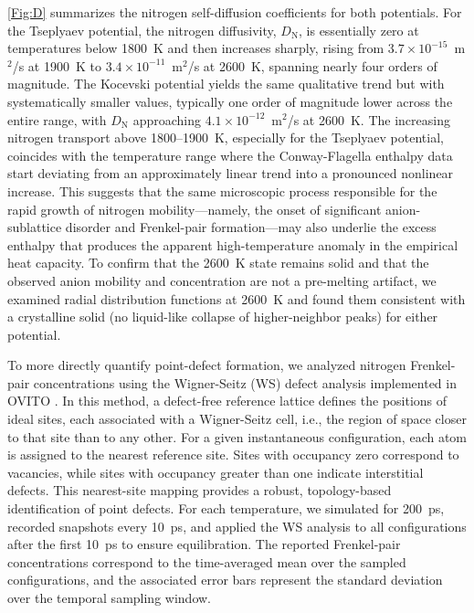 \documentclass[preprint,12pt,sort&compress]{elsarticle}
\newcommand{\?}{\stackrel{?}{=}}
\begin{document}
\cref{Fig:D} summarizes the nitrogen self-diffusion coefficients for both potentials. For the Tseplyaev potential, the nitrogen diffusivity, $D_\text{N}$, is essentially zero at temperatures below 1800~K and then increases sharply, rising from $3.7\times10^{-15}$~m$^{2}$/s at 1900~K to $3.4\times10^{-11}$~m$^{2}$/s at 2600~K, spanning nearly four orders of magnitude. The Kocevski potential yields the same qualitative trend but with systematically smaller values, typically one order of magnitude lower across the entire range, with $D_\text{N}$ approaching $4.1 \times 10^{-12}$~m$^{2}$/s at 2600~K. The increasing nitrogen transport above 1800--1900~K, especially for the Tseplyaev potential, coincides with the temperature range where the Conway-Flagella enthalpy data start deviating from an approximately linear trend into a pronounced nonlinear increase. This suggests that the same microscopic process responsible for the rapid growth of nitrogen mobility---namely, the onset of significant anion-sublattice disorder and Frenkel-pair formation---may also underlie the excess enthalpy that produces the apparent high-temperature anomaly in the empirical heat capacity. To confirm that the 2600~K state remains solid and that the observed anion mobility and concentration are not a pre-melting artifact, we examined radial distribution functions at 2600~K and found them consistent with a crystalline solid (no liquid-like collapse of higher-neighbor peaks) for either potential.

To more directly quantify point-defect formation, we analyzed nitrogen Frenkel-pair concentrations using the Wigner-Seitz (WS) defect analysis implemented in OVITO \cite{Stukowski2010}. In this method, a defect-free reference lattice defines the positions of ideal sites, each associated with a Wigner-Seitz cell, i.e., the region of space closer to that site than to any other. For a given instantaneous configuration, each atom is assigned to the nearest reference site. Sites with occupancy zero correspond to vacancies, while sites with occupancy greater than one indicate interstitial defects. This nearest-site mapping provides a robust, topology-based identification of point defects. For each temperature, we simulated for 200~ps, recorded snapshots every 10~ps, and applied the WS analysis to all configurations after the first 10~ps to ensure equilibration. The reported Frenkel-pair concentrations correspond to the time-averaged mean over the sampled configurations, and the associated error bars represent the standard deviation over the temporal sampling window.
\end{document}
